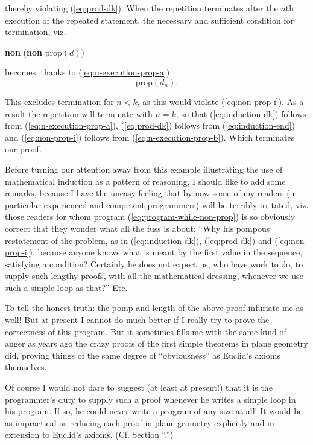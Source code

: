 \documentclass[twoside,11pt]{book}
\begin{document}
\noindent 
thereby violating (\ref{eq:prod-dk}). When the repetition terminates after the $n$th execution of the repeated statement, the necessary and sufficient condition for termination, viz.
\begin{center}
	\textbf{non} (\textbf{non} prop$(d)$)
\end{center}

\noindent
becomes, thanks to (\ref{eq:n-execution-prop-a})
\begin{equation}
	\label{eq:induction-end}
	\text{prop}(d_n).
\end{equation}

This excludes termination for $n < k$, as this would violate (\ref{eq:non-prop-i}). As a result the repetition will terminate with $n = k$, so that (\ref{eq:induction-dk}) follows from (\ref{eq:n-execution-prop-a}), (\ref{eq:prod-dk}) follows from (\ref{eq:induction-end}) and (\ref{eq:non-prop-i}) follows from (\ref{eq:n-execution-prop-b}). Which terminates our proof.

Before turning our attention away from this example illustrating the use of mathematical induction as a pattern of reasoning, I should like to add some remarks, because I have the uneasy feeling that by now some of my readers (in particular experienced and competent programmers) will be terribly irritated, viz. those readers for whom program (\ref{eq:program-while-non-prop}) is so obviously correct that they wonder what all the fuss is about: ``Why his pompous restatement of the problem, as in (\ref{eq:induction-dk}), (\ref{eq:prod-dk}) and (\ref{eq:non-prop-i}), because anyone knows what is meant by the first value in the sequence, satisfying a condition? Certainly he does not expect us, who have work to do, to supply such lengthy proofs, with all the mathematical dressing, whenever we use such a simple loop as that?'' Etc.

To tell the honest truth: the pomp and length of the above proof infuriate me as well! But at present I cannot do much better if I really try to prove the correctness of this program. But it sometimes fills me with the same kind of anger as years ago the crazy proofs of the first simple theorems in plane geometry did, proving things of the same degree of ``obviousness'' as Euclid's axioms themselves.

Of course I would not dare to suggest (at least at present!) that it is the programmer's duty to supply such a proof whenever he writes a simple loop in his program. If so, he could never write a program of any size at all! It would be as impractical as reducing each proof in plane geometry explicitly and in extension to Euclid's axioms. (Cf. Section ``.'')
\end{document}
